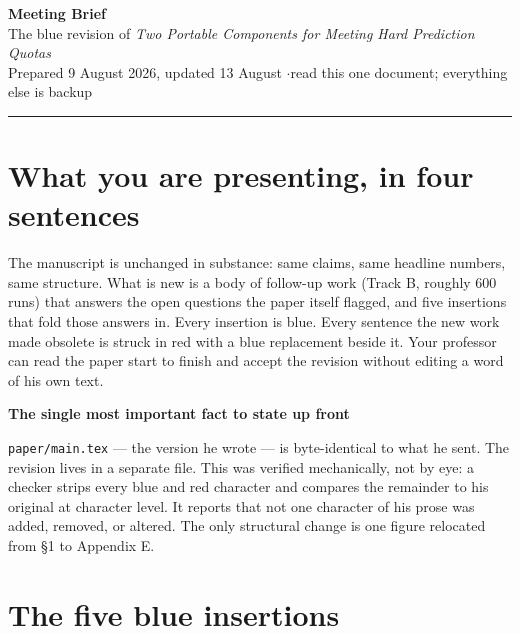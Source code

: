 \documentclass[11pt,a4paper]{article}
\newenvironment{callout}[1]
  {\par\medskip\noindent\begin{lrbox}{\calloutbox}%
   \begin{minipage}{\dimexpr\linewidth-20pt\relax}%
   \textbf{#1}\par\smallskip}
  {\end{minipage}\end{lrbox}%
   \setlength{\fboxsep}{10pt}%
   \colorbox{boxgrey}{\usebox{\calloutbox}}\par\medskip}
\newcommand{\blue}[1]{\textcolor{revblue}{#1}}
\begin{document}
\begin{center}
{\LARGE\bfseries Meeting Brief}\\[3pt]
{\large The blue revision of \emph{Two Portable Components for Meeting Hard
Prediction Quotas}}\\[6pt]
{\small Prepared 9 August 2026, updated 13 August \quad$\cdot$\quad read this one document; everything else is backup}
\end{center}

\vspace{4pt}
\hrule
\vspace{10pt}

\section{What you are presenting, in four sentences}

The manuscript is unchanged in substance: same claims, same headline numbers, same
structure. What is new is a body of follow-up work (Track B, roughly 600 runs) that
answers the open questions the paper itself flagged, and five insertions that fold those
answers in. \blue{Every insertion is blue.} \textcolor{revred}{Every sentence the new work
made obsolete is struck in red with a blue replacement beside it.} Your professor can read
the paper start to finish and accept the revision without editing a word of his own text.

\begin{callout}{The single most important fact to state up front}
\texttt{paper/main.tex} --- the version he wrote --- is byte-identical to what he sent.
The revision lives in a separate file. This was verified mechanically, not by eye: a
checker strips every blue and red character and compares the remainder to his original at
character level. It reports that not one character of his prose was added, removed, or
altered. The only structural change is one figure relocated from \S1 to Appendix E.
\end{callout}

\section{The five blue insertions}
\end{document}
